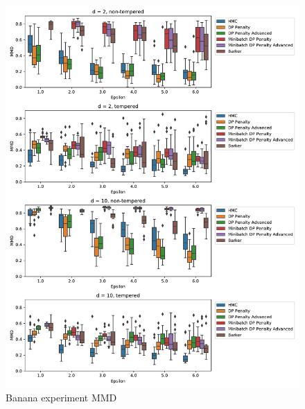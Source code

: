 ﻿\documentclass[a4paper]{article}
\begin{document}
\begin{figure}[h]
  \centering
  \includegraphics[width=\textwidth]{figures/banana_mmd}
  \caption{Banana experiment MMD}
  \label{banana_mmd_fig}
\end{figure}
\end{document}
